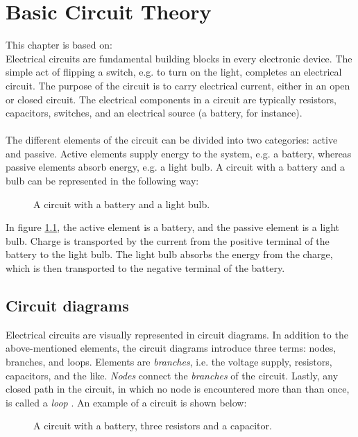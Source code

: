 \chapter{Basic Circuit Theory} \label{ch:basic}
This chapter is based on: \cite{bcircuit} \cite{bcircuit5}\\
Electrical circuits are fundamental building blocks in every electronic device. The simple act of flipping a switch, e.g. to turn on the light, completes an electrical circuit. The purpose of the circuit is to carry electrical current, either in an open or closed circuit. The electrical components in a circuit are typically resistors, capacitors,  switches, and an electrical source (a battery, for instance).
\\ 
\\
The different elements of the circuit can be divided into two categories: active and passive. Active elements supply energy to the system, e.g. a battery, whereas passive elements absorb energy, e.g. a light bulb. A circuit with a battery and a bulb can be represented in the following way:
\begin{figure}[H]

\caption{A circuit with a battery and a light bulb.}
\label{fig:bulb}
\end{figure} 
\noindent In figure \ref{fig:bulb}, the active element is a battery, and the passive element is a light bulb. Charge is transported by the current from the positive terminal of the battery to the light bulb. The light bulb absorbs the energy from the charge, which is then transported to the negative terminal of the battery.
\\



\section{Circuit diagrams}
Electrical circuits are visually represented in circuit diagrams. In addition to the above-mentioned elements, the circuit diagrams introduce three terms: nodes, branches, and loops. Elements are \textit{branches}, i.e.  the voltage supply, resistors, capacitors, and the like. \textit{Nodes} connect the \textit{branches} of the circuit. Lastly, any closed path in the circuit, in which no node is encountered more than than once, is called a \textit{loop} \cite[p.~32]{bcircuit}. An example of a circuit is shown below:

\begin{figure}[H] 
 
 \caption{A circuit with a battery, three resistors and a capacitor.}
 \label{bcircuit_figure}
\end{figure}

